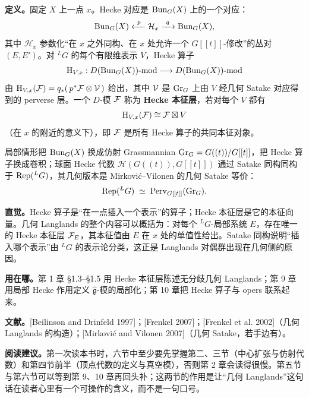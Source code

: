 \textbf{定义。}固定 $X$ 上一点 $x$。Hecke 对应是 $\operatorname{Bun}_G(X)$ 上的一个对应：
\[
  \Bun_G(X)\xleftarrow{\ p\ }\mathcal{H}_x\xrightarrow{\ q\ }\Bun_G(X),
\]
其中 $\mathcal{H}_x$ 参数化“在 $x$ 之外同构、在 $x$ 处允许一个 $G[[t]]$-修改”的丛对 $(E,E')$。对 ${}^L G$ 的每个有限维表示 $V$，Hecke 算子
\[
  \mathrm{H}_{V,x}:D(\operatorname{Bun}_G(X))\text{-}\mathrm{mod}\longrightarrow D(\operatorname{Bun}_G(X))\text{-}\mathrm{mod}
\]
由 $\mathrm{H}_{V,x}(\mathcal{F})=q_*(\,p^*\mathcal{F}\otimes\mathcal{V}\,)$ 给出，其中 $\mathcal{V}$ 是 $\operatorname{Gr}_G$ 上由 $V$ 经几何 Satake 对应得到的 perverse 层。一个 $D$-模 $\mathcal{F}$ 称为 \textbf{Hecke 本征层}，若对每个 $V$ 都有
\[
  \mathrm{H}_{V,x}(\mathcal{F})\cong \mathcal{F}\boxtimes V
\]
（在 $x$ 的附近的意义下），即 $\mathcal{F}$ 是所有 Hecke 算子的共同本征对象。

局部情形把 $\operatorname{Bun}_G(X)$ 换成仿射 Grassmannian $\operatorname{Gr}_G=G((t))/G[[t]]$，把 Hecke 算子换成卷积；球面 Hecke 代数 $\mathcal{H}(G((t)),G[[t]])$ 通过 Satake 同构同构于 $\operatorname{Rep}({}^L G)$，其几何版本是 Mirković--Vilonen 的几何 Satake 等价：
\[
  \operatorname{Rep}({}^L G)\;\simeq\;\operatorname{Perv}_{G[[t]]}(\operatorname{Gr}_G).
\]

\textbf{直觉。}Hecke 算子是“在一点插入一个表示”的算子；Hecke 本征层是它的本征向量。几何 Langlands 的整个内容可以概括为：对每个 ${}^L G$-局部系统 $E$，存在唯一的 Hecke 本征层 $\mathcal{F}_E$，其本征值由 $E$ 在 $x$ 处的单值性给出。Satake 同构说明“插入哪个表示”由 ${}^L G$ 的表示论分类，这正是 Langlands 对偶群出现在几何侧的原因。

\textbf{用在哪。}第 1 章 §1.3–§1.5 用 Hecke 本征层陈述无分歧几何 Langlands；第 9 章用局部 Hecke 作用定义 $\hat{\mathfrak{g}}$-模的局部化；第 10 章把 Hecke 算子与 opers 联系起来。

\textbf{文献。}[Beilinson and Drinfeld 1997]；[Frenkel 2007]；[Frenkel et al. 2002]（几何 Langlands 的构造）；[Mirković and Vilonen 2007]（几何 Satake，若手边有）。

\bigskip
\noindent\textbf{阅读建议。}第一次读本书时，六节中至少要先掌握第二、三节（中心扩张与仿射代数）和第四节前半（顶点代数的定义与真空模），否则第 2 章会读得很慢。第五节与第六节可以等到第 9、10 章再回头补；这两节的作用是让“几何 Langlands”这句话在读者心里有一个可操作的含义，而不是一句口号。
